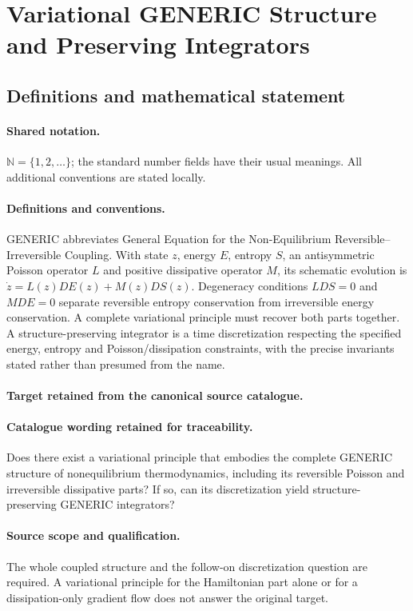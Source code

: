 \documentclass[11pt]{article}
\begin{document}
\section{Variational GENERIC Structure and Preserving Integrators}\label{statement}

\subsection{Definitions and mathematical statement}

\paragraph{Shared notation.}$\mathbb N=\{1,2,\ldots\}$; the standard number fields have their usual meanings. All additional conventions are stated locally.


\paragraph{Definitions and conventions.}
GENERIC abbreviates General Equation for the Non-Equilibrium Reversible--Irreversible Coupling. With state $z$, energy $E$, entropy $S$, an antisymmetric Poisson operator $L$ and positive dissipative operator $M$, its schematic evolution is $\dot z=L(z)DE(z)+M(z)DS(z)$. Degeneracy conditions $LDS=0$ and $MDE=0$ separate reversible entropy conservation from irreversible energy conservation. A complete variational principle must recover both parts together. A structure-preserving integrator is a time discretization respecting the specified energy, entropy and Poisson/dissipation constraints, with the precise invariants stated rather than presumed from the name.

\paragraph{Target retained from the canonical source catalogue.}
\paragraph{Catalogue wording retained for traceability.}
Does there exist a variational principle that embodies the complete GENERIC structure of nonequilibrium thermodynamics, including its reversible Poisson and irreversible dissipative parts? If so, can its discretization yield structure-preserving GENERIC integrators?

\paragraph{Source scope and qualification.}
The whole coupled structure and the follow-on discretization question are required. A variational principle for the Hamiltonian part alone or for a dissipation-only gradient flow does not answer the original target.
\end{document}
